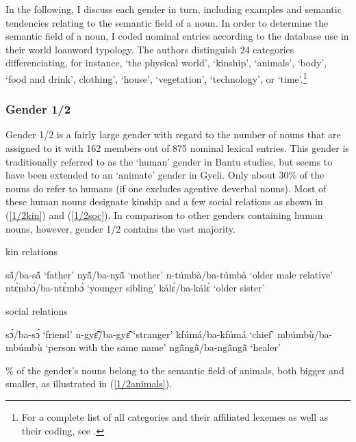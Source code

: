 In the following, I discuss each gender in turn, including examples and semantic tendencies relating to the semantic field of a noun. In order to determine the semantic field of a noun, I coded nominal entries according to the database \citet{haspelmath2009} use in their world loanword typology. The authors distinguish 24 categories differenciating, for instance, `the physical world', `kinship', `animals', `body', `food and drink', clothing', `house', `vegetation', `technology', or `time'.\footnote{For a complete list of all categories and their affiliated lexemes as well as their coding, see \citet[22-34]{haspelmath2009}.}

\subsubsection{Gender 1/2} 
\label{sec:1/2}

Gender 1/2  is a fairly large gender with regard to the number of nouns that are assigned to it with 162 members out of 875 nominal lexical entries. This gender is traditionally referred to as the `human' gender in Bantu studies, but seems to have been extended to an `animate' gender in Gyeli.  Only about 30\% of the nouns do refer to humans (if one excludes agentive deverbal nouns). Most of these human nouns designate kinship and a few social relations as shown in (\ref{1/2kin}) and (\ref{1/2soc}). In comparison to other genders containing human nouns, however, gender 1/2 contains the vast majority.

\begin{exe}
\ex\label{1/2kin} kin relations
\begin{xlist}
\ex sã́/ba-sã́ `father'
\ex nyã̂/ba-nyã̂ `mother'
\ex n-túmbà/ba-túmbà `older male relative'
\ex ntɛ̀mbɔ́/ba-ntɛ̀mbɔ́ `younger sibling'
\ex kálɛ́/ba-kálɛ́ `older sister'
\end{xlist}
\end{exe}

\begin{exe}
\ex\label{1/2soc} social relations
\begin{xlist}
\ex sɔ́/ba-sɔ́ `friend'
\ex n-gyɛ̃̂/ba-gyɛ̃̂ `stranger'
\ex kfúmá/ba-kfúmá `chief'
\ex mbúmbù/ba-mbúmbù `person with the same name'
\ex ngã̂ngã̂/ba-ngã̂ngã̂ `healer'
\end{xlist}
\end{exe}

\% of the gender's nouns belong to the semantic field of animals, both bigger and smaller, as illustrated in (\ref{1/2animals}).

